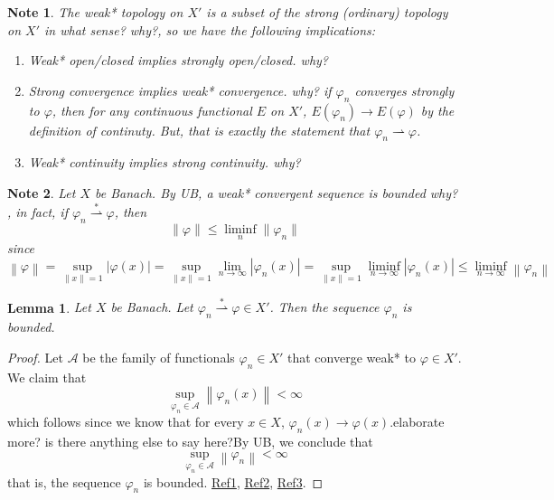 \documentclass[letterpaper,twoside,11pt]{article}
\theoremstyle{mystyle}
\newtheorem{lemma}[theorem]{Lemma}
\newtheorem*{note}{Note}
\newcommand{\cg}{\color{gray}}
\newcommand{\cbk}{\color{black}}
\newcommand{\cred}{\color{red}}
\begin{document}
\begin{note}
  The weak* topology on $X'$ is a subset of the strong (ordinary) topology on $X'$ \cred in what sense? why?\cbk, so we have the following implications: 

  \begin{enumerate}
    \item Weak* open/closed implies strongly open/closed. \cg why? \cbk
    \item Strong convergence implies weak* convergence. \cg why? if $\varphi_n$ converges strongly to $\varphi$, then for any continuous functional $E$ on $X'$, $E(\varphi_n) \to E(\varphi)$ by the definition of continuty. But, that is exactly the statement that $\varphi_n\rightharpoonup\varphi$.   \cbk
    \item Weak* continuity implies strong continuity. \cg why? \cbk
  \end{enumerate}

\end{note}

\begin{note}
  Let $X$ be Banach. By UB, a weak* convergent sequence is bounded \cred why? \cbk, in fact, if $\varphi_n \stackrel{\ast}{\rightharpoonup} \varphi$, then 
  \[\|\varphi\|\leq \liminf_n \|\varphi_n\|\]
  since
  \[\left\| \varphi  \right\| = \mathop {\sup }\limits_{\left\| x \right\| = 1} \left| {\varphi \left( x \right)} \right| = \mathop {\sup }\limits_{\left\| x \right\| = 1} \mathop {\lim }\limits_{n \to \infty } \left| {{\varphi _n}\left( x \right)} \right| = \mathop {\sup }\limits_{\left\| x \right\| = 1} \mathop {\lim \inf }\limits_{n \to \infty } \left| {{\varphi _n}\left( x \right)} \right| \leqslant \mathop {\lim \inf }\limits_{n \to \infty } \left\| {{\varphi _n}} \right\|\]
\end{note}
\begin{lemma}
  Let $X$ be Banach. Let $\varphi_n \stackrel{\ast}{\rightharpoonup} \varphi \in X'$. Then the sequence $\varphi_n$ is bounded. 
\end{lemma}
\begin{proof}
  Let $\mathcal A$ be the family of functionals $\varphi_n \in X'$ that converge weak* to $\varphi \in X'$. We claim that \[\mathop {\sup }\limits_{{\varphi _n} \in \mathcal{A}} \left\| {{\varphi _n}\left( x \right)} \right\| < \infty \] which follows since we know that for every $x\in X$, $\varphi_n(x) \to \varphi(x)$.\cg elaborate more? is there anything else to say here?\cbk By UB, we conclude that \[\mathop {\sup }\limits_{{\varphi _n} \in \mathcal{A}} \left\| {{\varphi _n}} \right\| < \infty \]
  that is, the sequence $\varphi_n$ is bounded. \cred 
  \href{https://math.berkeley.edu/~sarason/Class_Webpages/solutions_202B_assign13.pdf}{Ref1}, \href{https://heil.math.gatech.edu/handouts/weak.pdf}{Ref2}, \href{https://math.stackexchange.com/questions/1368767/do-we-need-completeness-for-a-weak-convergent-sequence-to-be-bounded}{Ref3}. \cbk 
\end{proof}
\end{document}
